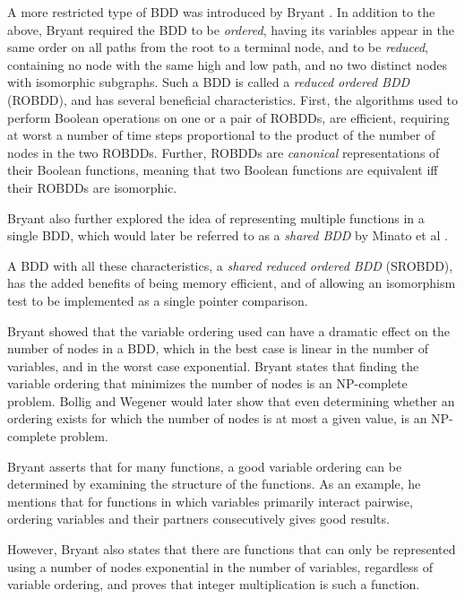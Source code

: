 \documentclass[a4paper,11pt]{kth-mag}
\begin{document}
A more restricted type of BDD was introduced by Bryant \cite{bryant86}.
In addition to the above, Bryant required the BDD to be \emph{ordered}, having its variables appear in the same order on all paths from the root to a terminal node,
and to be \emph{reduced}, containing no node with the same high and low path, and no two distinct nodes with isomorphic subgraphs.
Such a BDD is called a \emph{reduced ordered BDD} (ROBDD), and has several beneficial characteristics.
First, the algorithms used to perform Boolean operations on one or a pair of ROBDDs, are efficient, requiring at worst a number of time steps proportional to the product of the number of nodes in the two ROBDDs.
Further, ROBDDs are \emph{canonical} representations of their Boolean functions, meaning that two Boolean functions are equivalent iff their ROBDDs are isomorphic.

Bryant also further explored the idea of representing multiple functions in a single BDD, which would later be referred to as a \emph{shared BDD} by Minato et al \cite{minato90}.

A BDD with all these characteristics, a \emph{shared reduced ordered BDD} (SROBDD), has the added benefits of being memory efficient, and of allowing an isomorphism test to be implemented as a single pointer comparison.

Bryant showed that the variable ordering used can have a dramatic effect on the number of nodes in a BDD, which in the best case is linear in the number of variables, and in the worst case exponential.
Bryant states that finding the variable ordering that minimizes the number of nodes is an NP-complete problem.
Bollig and Wegener \cite{bollig96} would later show that even determining whether an ordering exists for which the number of nodes is at most a given value, is an NP-complete problem.

Bryant asserts that for many functions, a good variable ordering can be determined by examining the structure of the functions.
As an example, he mentions that for functions in which variables primarily interact pairwise, ordering variables and their partners consecutively gives good results.

However, Bryant also states that there are functions that can only be represented using a number of nodes exponential in the number of variables, regardless of variable ordering, and proves that integer multiplication is such a function.

\end{document}
